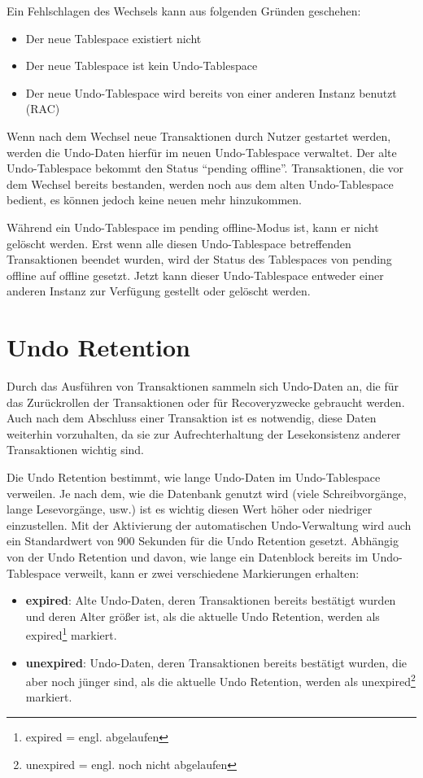           Ein Fehlschlagen des Wechsels kann aus folgenden Gründen geschehen:
          \begin{itemize}
            \item Der neue Tablespace existiert nicht
            \item Der neue Tablespace ist kein Undo-Tablespace
            \item Der neue Undo-Tablespace wird bereits von einer anderen Instanz benutzt (RAC)
          \end{itemize}
          Wenn nach dem Wechsel neue Transaktionen durch Nutzer gestartet werden, werden die Undo-Daten hierfür im neuen Undo-Tablespace verwaltet. Der alte Undo-Tablespace bekommt den Status \enquote{pending offline}. Transaktionen, die vor dem Wechsel bereits bestanden, werden noch aus dem alten Undo-Tablespace bedient, es können jedoch keine neuen mehr hinzukommen.

          Während ein Undo-Tablespace im pending offline-Modus ist, kann er nicht gelöscht werden. Erst wenn alle diesen Undo-Tablespace betreffenden Transaktionen beendet wurden, wird der Status des Tablespaces von pending offline auf offline gesetzt. Jetzt kann dieser Undo-Tablespace entweder einer anderen Instanz zur Verfügung gestellt oder gelöscht werden.
    \section{Undo Retention}
      \label{undoretention}
      Durch das Ausführen von Transaktionen sammeln sich Undo-Daten an, die für das Zurückrollen der Transaktionen oder für Recoveryzwecke gebraucht werden. Auch nach dem Abschluss einer Transaktion ist es notwendig, diese Daten weiterhin vorzuhalten, da sie zur Aufrechterhaltung der Lesekonsistenz anderer Transaktionen wichtig sind.

      Die Undo Retention bestimmt, wie lange Undo-Daten im Undo-Tablespace verweilen. Je nach dem, wie die Datenbank genutzt wird (viele Schreibvorgänge, lange Lesevorgänge, usw.) ist es wichtig diesen Wert höher oder niedriger einzustellen. Mit der Aktivierung der automatischen Undo-Verwaltung wird auch ein Standardwert von 900 Sekunden für die Undo Retention gesetzt.      Abhängig von der Undo Retention und davon, wie lange ein Datenblock bereits im Undo-Tablespace verweilt, kann er zwei verschiedene Markierungen erhalten:
      \begin{itemize}
        \item \textbf{expired}: Alte Undo-Daten, deren Transaktionen bereits bestätigt wurden und deren Alter größer ist, als die aktuelle Undo Retention, werden als expired\footnote{expired = engl. abgelaufen} markiert.
        \item \textbf{unexpired}: Undo-Daten, deren Transaktionen bereits bestätigt wurden, die aber noch jünger sind, als die aktuelle Undo Retention, werden als unexpired\footnote{unexpired = engl. noch nicht abgelaufen} markiert.
      \end{itemize}

